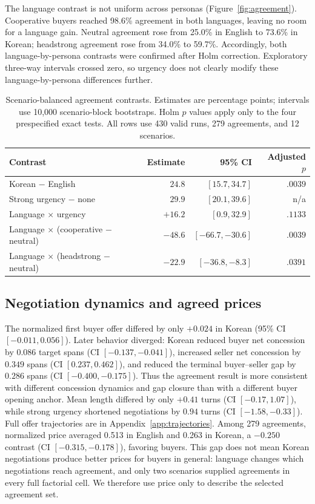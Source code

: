 \documentclass{article}
\begin{document}
The language contrast is not uniform across personas
(Figure~\ref{fig:agreement}). Cooperative buyers reached 98.6\% agreement in
both languages, leaving no room for a language gain. Neutral agreement rose
from 25.0\% in English to 73.6\% in Korean; headstrong agreement rose from
34.0\% to 59.7\%. Accordingly, both language-by-persona contrasts were
confirmed after Holm correction. Exploratory three-way intervals crossed
zero, so urgency does not clearly modify these language-by-persona
differences further.

\begin{table}[t]
\caption{Scenario-balanced agreement contrasts. Estimates are percentage
points; intervals use 10,000 scenario-block bootstraps. Holm $p$ values apply
only to the four prespecified exact tests. All rows use 430 valid runs, 279
agreements, and 12 scenarios.}
\label{tab:headline}
\centering
\small

\begin{tabular}{lrrr}
\toprule
Contrast & Estimate & 95\% CI & Adjusted $p$ \\
\midrule
Korean $-$ English & $24.8$ & $[15.7,34.7]$ & $.0039$ \\
Strong urgency $-$ none & $29.9$ & $[20.1,39.6]$ & n/a \\
Language $\times$ urgency & $+16.2$ & $[0.9,32.9]$ & $.1133$ \\
Language $\times$ (cooperative $-$ neutral) & $-48.6$ & $[-66.7,-30.6]$ & $.0039$ \\
Language $\times$ (headstrong $-$ neutral) & $-22.9$ & $[-36.8,-8.3]$ & $.0391$ \\
\bottomrule
\end{tabular}
\end{table}


\subsection{Negotiation dynamics and agreed prices}

The normalized first buyer offer differed by only $+0.024$ in Korean (95\% CI
$[-0.011,0.056]$). Later behavior diverged: Korean reduced buyer net
concession by $0.086$ target spans (CI $[-0.137,-0.041]$), increased seller
net concession by $0.349$ spans (CI $[0.237,0.462]$), and reduced the
terminal buyer--seller gap by $0.286$ spans (CI $[-0.400,-0.175]$). Thus the
agreement result is more consistent with different concession dynamics and
gap closure than with a different buyer opening anchor. Mean length differed
by only $+0.41$ turns (CI $[-0.17,1.07]$), while strong urgency shortened
negotiations by $0.94$ turns (CI $[-1.58,-0.33]$). Full offer trajectories are in Appendix~\ref{app:trajectories}. Among 279 agreements, normalized price averaged 0.513 in English and 0.263
in Korean, a $-0.250$ contrast (CI $[-0.315,-0.178]$), favoring buyers. This
gap does not mean Korean negotiations produce better prices for buyers in
general: language changes which negotiations reach agreement, and only two
scenarios supplied agreements in every full factorial cell. We therefore use
price only to describe the selected agreement set.
\end{document}
